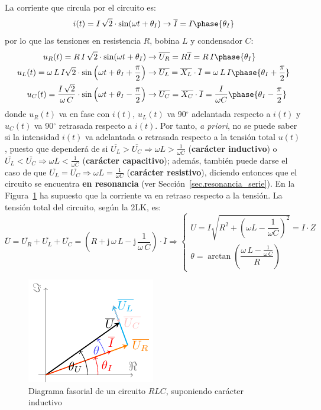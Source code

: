 \documentclass[11pt]{book} %
\numberwithin{dummy}{section}
\theoremstyle{ocrenumbox}
\theoremstyle{blacknumex}
\theoremstyle{blacknumbox}
\theoremstyle{ocrenum}
\newlength\esp
\begin{document}
	La corriente que circula por el circuito es:
	\begin{equation*}
		i(t)=I\,\sqrt{2}\cdot\sin(\omega t+\theta_I)\rightarrow\overline{I}=I\phase{\theta_I}
	\end{equation*}
	por lo que las tensiones en resistencia $R$, bobina $L$ y condensador $C$:
	\begin{align*}
		u_R(t)=R\, I\,\sqrt{2}\cdot\sin(\omega t+\theta_I)&\rightarrow \overline{U_R} = R \overline{I}=R\,I\phase{\theta_I}\\ 
		u_L(t)= \omega\,L\,I \sqrt{2}\cdot \sin \left(\omega t+\theta_I+\frac{\pi}{2}\right)&\rightarrow \overline{U_L}=\overline{X_L}\cdot\overline{I}= \omega\,L\,I\phase{\theta_I+\frac{\pi}{2}}\\
		u_C(t)=\dfrac{I\,\sqrt{2}}{\omega\,C} \cdot \sin \left(\omega t+\theta_I-\frac{\pi}{2}\right)&\rightarrow \overline{U_C}=\overline{X_C}\cdot\overline{I}=\dfrac{I}{\omega C}\phase{\theta_I-\frac{\pi}{2}}
	\end{align*}
	donde $u_R(t)$ va en fase con $i(t)$, $u_L(t)$ va 90$^\circ$ adelantada respecto a $i(t)$ y $u_C(t)$ va 90$^\circ$ retrasada respecto a $i(t)$. Por tanto, \textit{a priori}, no se puede saber si la intensidad $i(t)$ va {adelantada o retrasada} respecto a la tensión total $u(t)$, puesto que dependerá de si $\overline{U_L}>\overline{U_C}\Rightarrow \omega L>\frac{1}{\omega C}$ (\textbf{carácter inductivo}) o $\overline{U_L}<\overline{U_C}\Rightarrow \omega L<\frac{1}{\omega C}$ (\textbf{carácter capacitivo}); además, también puede darse el caso de que $\overline{U_L}=\overline{U_C}\Rightarrow \omega L=\frac{1}{\omega C}$ (\textbf{carácter resistivo}), diciendo entonces que el circuito se encuentra \textbf{en resonancia} (ver Sección~\ref{sec.resonancia_serie}). En la Figura~\ref{fig.fasorRLC_VI} ha supuesto que la corriente va en retraso respecto a la tensión. La tensión total del circuito, según la 2LK, es:  
	\begin{equation*}
		\overline{U} = \overline{U_R} +\overline{U_L} + \overline{U_C} =\left(R+\mathrm{j}\,\omega\,L - \mathrm{j}\,\dfrac{1}{\omega\,C}\right) \cdot \overline{I}\Rightarrow 
		\begin{cases}
			U=I\sqrt{R^2 + \left(\omega L - \dfrac{1}{\omega C}\right)^2}=I\cdot Z\\
			\theta=\arctan\left( \dfrac{\omega\,L-\frac{1}{\omega\,C}}{R}\right)
		\end{cases}
	\end{equation*}
	
	\begin{figure}[htbp]
		\centering \includegraphics[width=0.3\linewidth]{../figs/fasorRLC_VI.pdf}
		\caption{Diagrama fasorial de un circuito $RLC$, suponiendo carácter inductivo}
		\label{fig.fasorRLC_VI}
	\end{figure}
	
\end{document}
